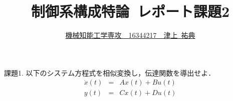 \documentclass[a4paper,12pt]{jarticle}
\begin{document}
%
\title{\vspace{-30mm} 制御系構成特論~レポート課題2}
\author{\underline{機械知能工学専攻~~16344217~~津上~祐典}}
\date{}
%
\maketitle
%
\vspace{-25mm}
%

\begin{itembox}[l]{\Large{課題1.}}
以下のシステム方程式を相似変換し，伝達関数を導出せよ．
  \begin{eqnarray}
   \dot{x}(t)&=&Ax(t)+Bu(t) \\
   y(t)&=&Cx(t)+Du(t)
  \end{eqnarray}
\end{itembox}

\vspace{-10mm}
\end{document}

